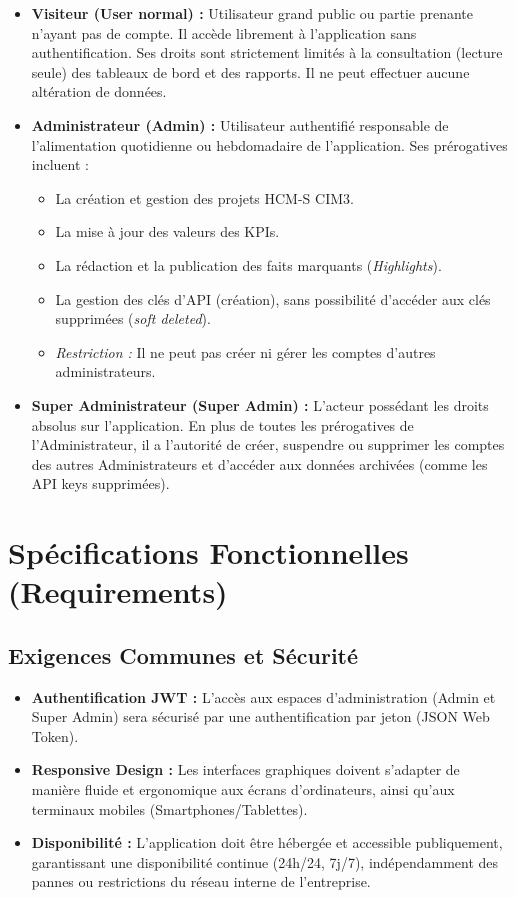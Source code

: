 \begin{itemize}
    \item \textbf{Visiteur (User normal) :} Utilisateur grand public ou partie prenante n'ayant pas de compte. Il accède librement à l'application sans authentification. Ses droits sont strictement limités à la consultation (lecture seule) des tableaux de bord et des rapports. Il ne peut effectuer aucune altération de données.
    
    \item \textbf{Administrateur (Admin) :} Utilisateur authentifié responsable de l'alimentation quotidienne ou hebdomadaire de l'application. Ses prérogatives incluent :
    \begin{itemize}
        \item La création et gestion des projets HCM-S CIM3.
        \item La mise à jour des valeurs des KPIs.
        \item La rédaction et la publication des faits marquants (\textit{Highlights}).
        \item La gestion des clés d'API (création), sans possibilité d'accéder aux clés supprimées (\textit{soft deleted}).
        \item \textit{Restriction :} Il ne peut pas créer ni gérer les comptes d'autres administrateurs.
    \end{itemize}

    \item \textbf{Super Administrateur (Super Admin) :} L'acteur possédant les droits absolus sur l'application. En plus de toutes les prérogatives de l'Administrateur, il a l'autorité de créer, suspendre ou supprimer les comptes des autres Administrateurs et d'accéder aux données archivées (comme les API keys supprimées).
\end{itemize}

\section{Spécifications Fonctionnelles (Requirements)}

\subsection{Exigences Communes et Sécurité}
\begin{itemize}
    \item \textbf{Authentification JWT :} L'accès aux espaces d'administration (Admin et Super Admin) sera sécurisé par une authentification par jeton (JSON Web Token).
    \item \textbf{Responsive Design :} Les interfaces graphiques doivent s'adapter de manière fluide et ergonomique aux écrans d'ordinateurs, ainsi qu'aux terminaux mobiles (Smartphones/Tablettes).
    \item \textbf{Disponibilité :} L'application doit être hébergée et accessible publiquement, garantissant une disponibilité continue (24h/24, 7j/7), indépendamment des pannes ou restrictions du réseau interne de l'entreprise.
\end{itemize}

